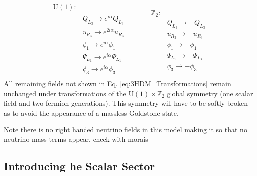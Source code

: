 \begin{equation}
\label{eq:3HDM_Transformations}
	\begin{split} 
	\mathrm{U(1)} : & \\
		& Q_{L_3} \rightarrow    e^{i \alpha} Q_{L_3}  \\  
		& u_{R_3} \rightarrow    e^{2 i \alpha} u_{R_3}  \\
		& \phi_1  \rightarrow    e^{i \alpha} \phi_1  \\   
		& \Psi_{L_1} \rightarrow e^{i \alpha} \Psi_{L_1} \\
		& \phi_3 \rightarrow     e^{i \alpha} \phi_3  \\ 
	\end{split} \quad \quad \quad  
	\begin{split}
		\mathbb{Z}_2 : & \\
		 	& Q_{L_3} \rightarrow -Q_{L_3} \\
		 	& u_{R_3} \rightarrow -u_{R_3} \\ 
		 	& \phi_1  \rightarrow -\phi_1 \\ 
		 	& \Psi_{L_1} \rightarrow - \Psi_{L_1} \\ 
		 	& \phi_3 \rightarrow -\phi_3
	\end{split} 
\end{equation} 
%
All remaining fields not shown in Eq. \ref{eq:3HDM_Transformations} remain unchanged under transformations of the $\mathrm{U(1)}\times\mathbb{Z}_2$ global symmetry (one scalar field and two fermion generations).  
%
This symmetry will have to be softly broken as to avoid the appearance of a massless Goldstone state.

Note there is no right handed neutrino fields in this model making it so that no neutrino mass terms appear. { \color{blue} check with morais } 

\subsection{Introducing he Scalar Sector}\label{subsection:Scalar_Sector}

